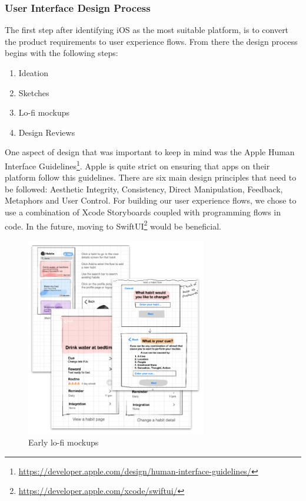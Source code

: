 \subsubsection{User Interface Design Process}
The first step after identifying iOS as the most suitable platform, is to convert the product requirements to user experience flows. From there the design process begins with the following steps:
\begin{enumerate}
    \item Ideation
    \item Sketches
    \item Lo-fi mockups
    \item Design Reviews
\end{enumerate}
One aspect of design that was important to keep in mind was the Apple Human Interface Guidelines\footnote{\url{https://developer.apple.com/design/human-interface-guidelines/}}. Apple is quite strict on ensuring that apps on their platform follow this guidelines. There are six main design principles that need to be followed: Aesthetic Integrity, Consistency, Direct Manipulation, Feedback, Metaphors and User Control.
\newline \newline
For building our user experience flows, we chose to use a combination of Xcode Storyboards coupled with programming flows in code. In the future, moving to SwiftUI\footnote{\url{https://developer.apple.com/xcode/swiftui/}} would be beneficial.
\begin{figure}[h]
\centering
\includegraphics[width=0.7\textwidth]{images/mockups.png}
\caption{Early lo-fi mockups}
\end{figure}
